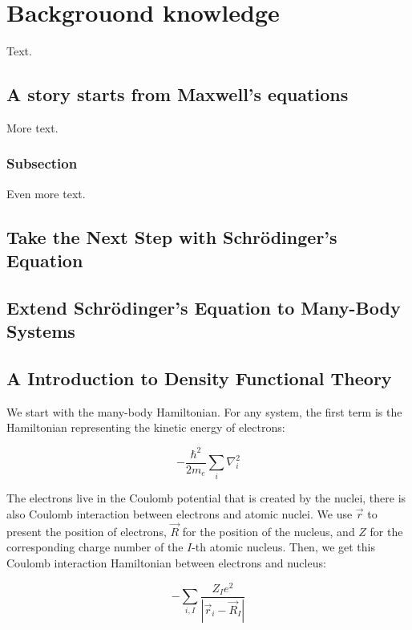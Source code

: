 \chapter{Backgrouond knowledge\label{cha:background}}

Text.

\section{A story starts from Maxwell's equations}

More text.

\subsection{Subsection}

Even more text.

\section{Take the Next Step with Schrödinger's Equation}

\section{Extend Schrödinger's Equation to Many-Body Systems}

\section{A Introduction to Density Functional Theory}

We start with the many-body Hamiltonian. For any system, the first term is the Hamiltonian representing the kinetic energy of electrons:

\begin{equation}
    -\frac{\hbar^2}{2m_e}\sum_i\nabla_i^2
    \label{electrons_kinetic}
\end{equation}

The electrons live in the Coulomb potential that is created by the nuclei, there is also Coulomb interaction between electrons and atomic nuclei. We use $\Vec{r}$ to present the position of electrons, $\Vec{R}$ for the position of the nucleus, and $Z$ for the corresponding charge number of the $I$-th atomic nucleus. Then, we get this Coulomb interaction Hamiltonian between electrons and nucleus:

\begin{equation}
    -\sum_{i,I}\frac{Z_I e^2}{|\Vec{r}_i-\Vec{R}_I|}
    \label{electrons_nucleus_Coulomb}
\end{equation}

